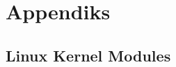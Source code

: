 \documentclass[main.tex]{subfile}
\begin{document}
\appendix
\section{Appendiks}
\subsection{Linux Kernel Modules}
\label{sec:simple.c}
\pagebreak
\end{document}
